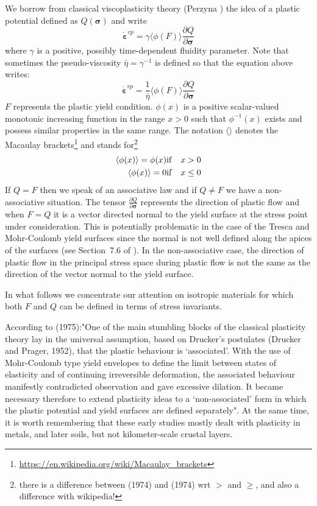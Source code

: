 We borrow from classical viscoplasticity theory (Perzyna \cite{perz66,perz88}) the idea of 
a plastic potential defined as $Q({\bm \sigma})$ and write
\begin{equation}
{\dot{\bm \varepsilon}}^{vp} 
= \gamma \Big\langle
\phi\left( F \right) 
\Big\rangle
\frac{\partial Q}{\partial \bm\sigma}
\end{equation}
where $\gamma$ is a positive, possibly time-dependent fluidity parameter. 
Note that sometimes the pseudo-viscosity $\bar{\eta}=\gamma^{-1}$ is defined \cite{zigo74}
so that the equation above writes:
\begin{equation}
{\dot{\bm \varepsilon}}^{vp} 
= \frac{1}{\bar{\eta}} \Big\langle
\phi\left( F \right) 
\Big\rangle
\frac{\partial Q}{\partial \bm\sigma}
\end{equation}
$F$ represents the plastic yield condition.
$\phi(x)$ is a positive scalar-valued monotonic increasing function in the range 
$x>0$ such that $\phi^{-1}(x)$ exists and possess similar properties in the same range. 
The notation $\langle \rangle$ denotes the Macaulay 
brackets\footnote{\url{https://en.wikipedia.org/wiki/Macaulay_brackets}} and stands 
for\footnote{there is a difference between 
\textcite{zico74}(1974) and \textcite{zico74b}(1974) wrt $>$ and $\ge$, and also 
a difference with wikipedia!} 
\begin{eqnarray}
\langle \phi(x) \rangle = \phi(x) & {\rm if} & x>0 \nonumber\\
\langle \phi(x) \rangle = 0 & {\rm if} & x\le 0 \nonumber
\end{eqnarray}
If $Q=F$ then we speak of an associative law and if $Q \neq F$ we have a non-associative situation. 
The tensor $\frac{\partial Q}{\partial \bm\sigma}$ represents the direction
of plastic flow and when $F=Q$ it is a vector directed normal to the yield surface
at the stress point under consideration. This is potentially problematic in the 
case of the Tresca and Mohr-Coulomb yield surfaces since the normal is not well defined
along the apices of the surfaces (see Section~7.6 of \textcite{owhi}).
In the non-associative case, the direction of plastic flow in the 
principal  stress space during plastic flow is not the same
as the direction of the vector normal to the yield surface.

In what follows we concentrate our attention on isotropic materials for which 
both $F$ and $Q$ can be defined in terms of stress invariants.

According to \textcite{zihl75} (1975):"One of the main stumbling blocks of the 
classical plasticity theory lay in the universal
assumption, based on Drucker's postulates (Drucker and Prager, 1952), that the plastic 
behaviour is `associated'. With the use of Mohr-Coulomb type yield envelopes to define the
limit between states of elasticity and of continuing irreversible deformation,
the associated behaviour manifestly contradicted observation and gave excessive dilation.
It became necessary therefore to extend plasticity ideas to a `non-associated'
form in which the plastic potential and yield surfaces are defined separately".
At the same time, it is worth remembering that these early studies mostly dealt
with plasticity in metals, and later soils, but not kilometer-scale crustal layers.


